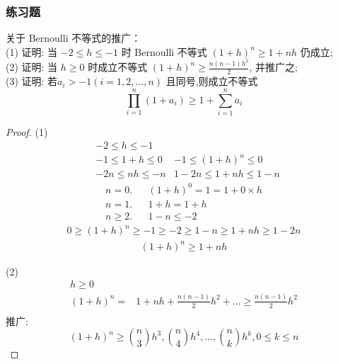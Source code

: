 \subsubsection{练习题}
\begin{example}	关于 Bernoulli 不等式的推广：\\	
	(1) 证明: 当 $ -2 \le h \le -1 $ 时 Bernoulli 不等式 $ (1+h)^n \ge 1+nh $ 仍成立;\\
	(2) 证明: 当 $ h \ge 0 $ 时成立不等式 $ (1+h)^n \ge \frac{n(n-1)h^2}{2} $, 并推广之;\\
	(3) 证明: 若$ a_i > -1(i = 1,2,\dots,n) $ 且同号,则成立不等式
	\[\prod_{i=1}^{n}(1+a_i) \ge 1 + \sum_{i=1}^n a_i \]
	\begin{proof}
		(1)			
		\begin{align*}
			& -2 \le h \le -1  & \\
			& -1 \le 1+h\le 0  & -1 \le (1+h)^n \le 0 \\
			& -2n \le nh \le -n& 1-2n \le 1+nh\le 1-n
		\end{align*}	
		\begin{align*}
			n=0. && (1+h)^0 = 1 = 1 + 0\times h\\
			n=1. && 1+h = 1+h\\
			n \ge 2. && 1-n \le -2
		\end{align*}	
		\begin{align*}
			0 \ge (1+h)^n \ge -1 \ge -2 \ge 1-n \ge 1+nh \ge 1-2n
		\end{align*}	
		\begin{align*}		
			(1+h)^n \ge 1+nh
	 	\end{align*}
	
		(2)
		\begin{align*}
			h\ge 0&\\
			(1+h)^n = &1+nh+\frac{n(n-1)}{2}h^2 + \dots \ge \frac{n(n-1)}{2}h^2\\
		\end{align*}
		推广:
		\begin{equation*}
			(1+h)^n \ge \binom{n}{3}h^3, \binom{n}{4}h^4, \dots, \binom{n}{k}h^k, 0\le k \le n
		\end{equation*}
		

\end{proof}
\end{example}
